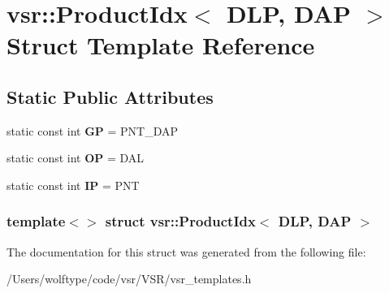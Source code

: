 \hypertarget{structvsr_1_1_product_idx_3_01_d_l_p_00_01_d_a_p_01_4}{\section{vsr\-:\-:Product\-Idx$<$ D\-L\-P, D\-A\-P $>$ Struct Template Reference}
\label{structvsr_1_1_product_idx_3_01_d_l_p_00_01_d_a_p_01_4}
}
\subsection*{Static Public Attributes}
\begin{DoxyCompactItemize}
\item 
\hypertarget{structvsr_1_1_product_idx_3_01_d_l_p_00_01_d_a_p_01_4_aadf5947b7f298f4dc2e62ea2bd98be68}{static const int {\bfseries G\-P} = P\-N\-T\-\_\-\-D\-A\-P}\label{structvsr_1_1_product_idx_3_01_d_l_p_00_01_d_a_p_01_4_aadf5947b7f298f4dc2e62ea2bd98be68}

\item 
\hypertarget{structvsr_1_1_product_idx_3_01_d_l_p_00_01_d_a_p_01_4_a9696ef1cfbf2a13af37e9cac0e353143}{static const int {\bfseries O\-P} = D\-A\-L}\label{structvsr_1_1_product_idx_3_01_d_l_p_00_01_d_a_p_01_4_a9696ef1cfbf2a13af37e9cac0e353143}

\item 
\hypertarget{structvsr_1_1_product_idx_3_01_d_l_p_00_01_d_a_p_01_4_a5e482886eaed1a916ae7d18773f68c38}{static const int {\bfseries I\-P} = P\-N\-T}\label{structvsr_1_1_product_idx_3_01_d_l_p_00_01_d_a_p_01_4_a5e482886eaed1a916ae7d18773f68c38}

\end{DoxyCompactItemize}
\subsubsection*{template$<$$>$ struct vsr\-::\-Product\-Idx$<$ D\-L\-P, D\-A\-P $>$}



The documentation for this struct was generated from the following file\-:\begin{DoxyCompactItemize}
\item 
/\-Users/wolftype/code/vsr/\-V\-S\-R/vsr\-\_\-templates.\-h\end{DoxyCompactItemize}
